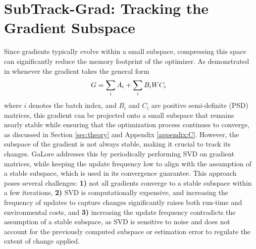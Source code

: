\section{SubTrack-Grad: Tracking the Gradient Subspace}
\label{sec:method}
Since gradients typically evolve within a small subspace, compressing this space can significantly reduce the memory footprint of the optimizer. As demonstrated in \citet{zhao2024galorememoryefficientllmtraining} whenever the gradient takes the general form 
\begin{equation}
\small
    G = \sum_i A_i + \sum_i B_iWC_i
    \label{eq:gradient-form}
\end{equation}
where \(i\) denotes the batch index, and \(B_i\) and \(C_i\) are positive semi-definite (PSD) matrices, this gradient can be projected onto a small subspace that remains nearly stable while ensuring that the optimization process continues to converge, as discussed in Section \ref{sec:theory} and Appendix \ref{appendix:C}.
However, the subspace of the gradient is not always stable, making it crucial to track its changes. GaLore \citep{zhao2024galorememoryefficientllmtraining} addresses this by periodically performing SVD on gradient matrices, while keeping the update frequency low to align with the assumption of a stable subspace, which is used in its convergence guarantee. This approach poses several challenges: {\bf 1)} not all gradients converge to a stable subspace within a few iterations, {\bf 2)} SVD is computationally expensive, and increasing the frequency of updates to capture changes significantly raises both run-time and environmental costs, and {\bf 3)} increasing the update frequency contradicts the assumption of a stable subspace, as SVD is sensitive to noise and does not account for the previously computed subspace or estimation error to regulate the extent of change applied.

